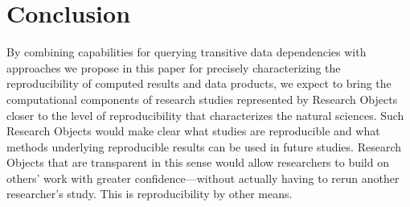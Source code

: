 \section{Conclusion}\label{sec-conclusion}

By combining capabilities for querying transitive data dependencies with 
	approaches we propose in this paper for precisely characterizing the reproducibility
	of computed
	results and data products, we expect to bring the computational components of research
	studies represented by Research Objects 
	closer to the level of reproducibility that characterizes the natural sciences.
Such Research Objects would make clear what studies are reproducible and what methods
	underlying reproducible
	results can be used in future studies.
Research Objects that are transparent in this sense would allow researchers to build 
	on others' work with greater confidence---without 
	actually having to rerun another researcher's study.
This is reproducibility by other means.

